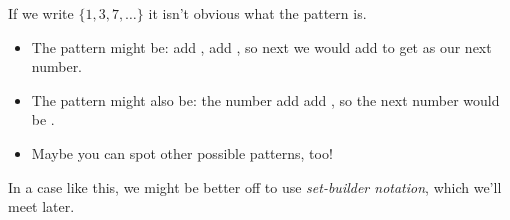 \begin{Example}
If we write $\{1,3,7,\dots\}$ it isn't obvious what the pattern is.
\begin{itemize}
\item The pattern might be: add \makeblanksmall, add \makeblanksmall, so next we would add \makeblanksmall to get \makeblanksmall as our next number.
\item The pattern might also be: \makeblank[1in] the number add add \makeblanksmall, so the next number would be \makeblank.
\item Maybe you can spot other possible patterns, too!
\end{itemize}
In a case like this, we might be better off to use \emph{set-builder notation}, which we'll meet later.
\end{Example}
